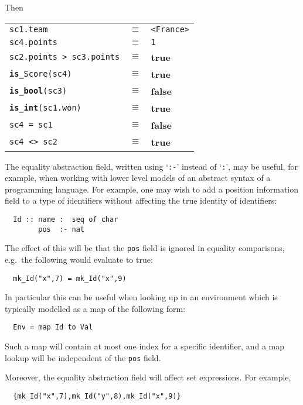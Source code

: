 \documentclass{overturerepchap}
\newcommand{\keyw}[1]{{\bf\ttfamily #1}}
\begin{document}
\begin{description}
\noindent%
Then

  \begin{tabular}{lcl}
    \texttt{sc1.team}            & $\equiv$ & \texttt{<France>}\\
    \texttt{sc4.points}          & $\equiv$ & \texttt{1}\\
    \texttt{sc2.points > sc3.points}
                                 & $\equiv$ & \keyw{true}\\
    \texttt{\keyw{is\_}Score(sc4)}
                                 & $\equiv$ & \keyw{true}\\
    \texttt{\keyw{is\_bool}(sc3)}
                                 & $\equiv$ & \keyw{false}\\
    \texttt{\keyw{is\_int}(sc1.won)}
                                 & $\equiv$ & \keyw{true}\\
    \texttt{sc4 = sc1}           & $\equiv$ & \keyw{false}\\
    \texttt{sc4 <> sc2}          & $\equiv$ & \keyw{true}
  \end{tabular}

  The equality abstraction field, written using `{\tt :-}' instead of
  `{\tt :}', may be useful, for example, when working with lower level
  models of an abstract syntax of a programming language. For example,
  one may wish to add a position information field to a type of
  identifiers without affecting the true identity of identifiers:

\begin{lstlisting}
  Id :: name :  seq of char
        pos  :- nat
\end{lstlisting}

The effect of this will be that the {\tt pos} field is
ignored in equality comparisons, e.g.\
the following would evaluate to true:

\begin{lstlisting}
  mk_Id("x",7) = mk_Id("x",9)
\end{lstlisting}

In particular this can be useful when looking up in an environment
which is typically modelled as a map of the following form:

\begin{lstlisting}
  Env = map Id to Val
\end{lstlisting}

Such a map will contain at most one index for a specific identifier,
and a map lookup will be independent of the {\tt pos} field.

Moreover, the equality abstraction field will affect set expressions.
For example,
\begin{lstlisting}
  {mk_Id("x",7),mk_Id("y",8),mk_Id("x",9)}
\end{lstlisting}


\end{description}
\end{document}
